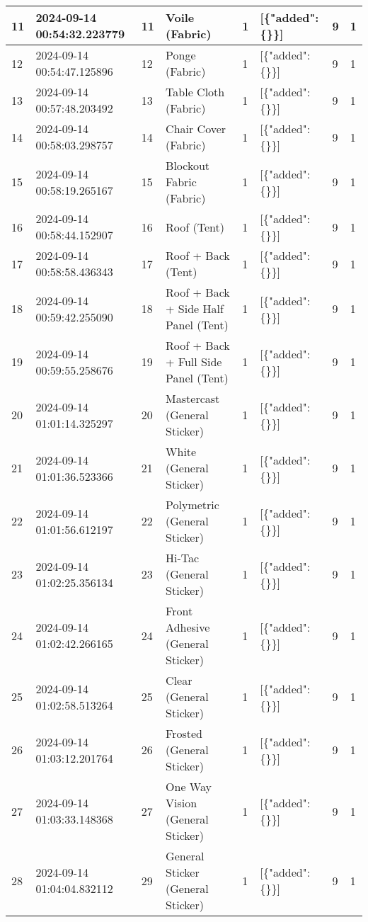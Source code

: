 \begin{longtable}{|l|l|l|l|l|l|l|l|}
11 & 2024-09-14 00:54:32.223779 & 11 & Voile (Fabric) & 1 & [\{"added": \{\}\}] & 9 & 1 \\ \hline 
12 & 2024-09-14 00:54:47.125896 & 12 & Ponge (Fabric) & 1 & [\{"added": \{\}\}] & 9 & 1 \\ \hline 
13 & 2024-09-14 00:57:48.203492 & 13 & Table Cloth (Fabric) & 1 & [\{"added": \{\}\}] & 9 & 1 \\ \hline 
14 & 2024-09-14 00:58:03.298757 & 14 & Chair Cover (Fabric) & 1 & [\{"added": \{\}\}] & 9 & 1 \\ \hline 
15 & 2024-09-14 00:58:19.265167 & 15 & Blockout Fabric (Fabric) & 1 & [\{"added": \{\}\}] & 9 & 1 \\ \hline 
16 & 2024-09-14 00:58:44.152907 & 16 & Roof (Tent) & 1 & [\{"added": \{\}\}] & 9 & 1 \\ \hline 
17 & 2024-09-14 00:58:58.436343 & 17 & Roof + Back (Tent) & 1 & [\{"added": \{\}\}] & 9 & 1 \\ \hline 
18 & 2024-09-14 00:59:42.255090 & 18 & Roof + Back + Side Half Panel (Tent) & 1 & [\{"added": \{\}\}] & 9 & 1 \\ \hline 
19 & 2024-09-14 00:59:55.258676 & 19 & Roof + Back + Full Side Panel (Tent) & 1 & [\{"added": \{\}\}] & 9 & 1 \\ \hline 
20 & 2024-09-14 01:01:14.325297 & 20 & Mastercast (General Sticker) & 1 & [\{"added": \{\}\}] & 9 & 1 \\ \hline 
21 & 2024-09-14 01:01:36.523366 & 21 & White (General Sticker) & 1 & [\{"added": \{\}\}] & 9 & 1 \\ \hline 
22 & 2024-09-14 01:01:56.612197 & 22 & Polymetric (General Sticker) & 1 & [\{"added": \{\}\}] & 9 & 1 \\ \hline 
23 & 2024-09-14 01:02:25.356134 & 23 & Hi-Tac (General Sticker) & 1 & [\{"added": \{\}\}] & 9 & 1 \\ \hline 
24 & 2024-09-14 01:02:42.266165 & 24 & Front Adhesive (General Sticker) & 1 & [\{"added": \{\}\}] & 9 & 1 \\ \hline 
25 & 2024-09-14 01:02:58.513264 & 25 & Clear (General Sticker) & 1 & [\{"added": \{\}\}] & 9 & 1 \\ \hline 
26 & 2024-09-14 01:03:12.201764 & 26 & Frosted (General Sticker) & 1 & [\{"added": \{\}\}] & 9 & 1 \\ \hline 
27 & 2024-09-14 01:03:33.148368 & 27 & One Way Vision (General Sticker) & 1 & [\{"added": \{\}\}] & 9 & 1 \\ \hline 
28 & 2024-09-14 01:04:04.832112 & 29 & General Sticker (General Sticker) & 1 & [\{"added": \{\}\}] & 9 & 1 \\ \hline 

\end{longtable}
